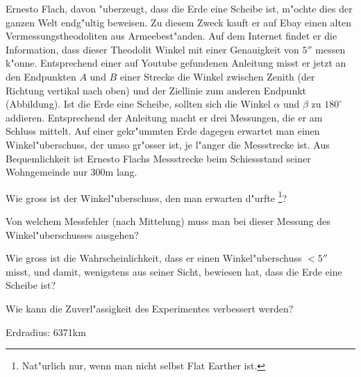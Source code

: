 Ernesto Flach, davon "uberzeugt, dass die Erde eine Scheibe ist,
m"ochte dies der ganzen Welt endg"ultig beweisen.
Zu diesem Zweck kauft er auf Ebay einen alten Vermessungstheodoliten
aus Armeebest"anden.
Auf dem Internet findet er die Information, dass dieser Theodolit Winkel
mit einer Genauigkeit von $5''$ messen k"onne.
Entsprechend einer auf Youtube gefundenen Anleitung misst er jetzt an
den Endpunkten $A$ und $B$ einer Strecke die Winkel zwischen Zenith
(der Richtung vertikal nach oben) und der Ziellinie zum anderen Endpunkt
(Abbildung).
Ist die Erde eine Scheibe, sollten sich die Winkel $\alpha$
und $\beta$ zu $180^\circ$
addieren.
Entsprechend der Anleitung macht er drei Messungen, die er am Schluss 
mittelt.
Auf einer gekr"ummten Erde dagegen erwartet man einen Winkel"uberschuss,
der umso gr"osser ist, je l"anger die Messstrecke ist.
Aus Bequemlichkeit ist Ernesto Flachs Messstrecke beim Schiessstand
seiner Wohngemeinde nur 300m lang.
\begin{center}
\end{center}

\begin{teilaufgaben}
\item
Wie gross ist der Winkel"uberschuss, den man erwarten d"urfte%
\footnote{Nat"urlich nur, wenn man nicht selbst Flat Earther ist.}?
\item
Von welchem Messfehler (nach Mittelung) muss man bei dieser Messung
des Winkel"uberschusses ausgehen?
\item
Wie gross ist die Wahrscheinlichkeit, dass er einen Winkel"uberschuss $<5''$
misst, und damit, wenigstens aus seiner Sicht, bewiesen hat, dass
die Erde eine Scheibe ist?
\item 
Wie kann die Zuverl"assigkeit des Experimentes verbessert werden?
\end{teilaufgaben}

\begin{hinweis}
Erdradius: 6371km
\end{hinweis}

